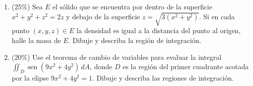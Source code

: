 \documentclass[11pt]{article}
\begin{document}
\begin{enumerate}
\begin{enumerate}
\item{} (17\%) Evalúe la integral $\displaystyle\int_0^1\int_0^{\cos^{-1}y} e^{\operatorname{sen}x}\,dx\,dy$. Dibuje y describa la región de integración.

\vspace{5cm}
\end{enumerate}

\item{} (25\%) Sea $E$ el sólido que se encuentra por dentro de la superficie $x^2+y^2+z^2=2z$ y debajo de la superficie $z=\sqrt{3(x^2+y^2)}$. Si en cada punto $(x,y,z)\in E$ la densidad es igual a la distancia del punto al origen, halle la masa de $E$. Dibuje y describa la región de integración.

\vspace{6cm}

\item{} (20\%) Use el teorema de cambio de variables para evaluar la integral $\displaystyle\iint_D \operatorname{sen}(9x^2+4y^2)\,dA$, donde $D$ es la región del primer cuadrante acotada por la elipse $9x^2+4y^2=1$. Dibuje y describa las regiones de integración.

\vspace{6cm}
\end{enumerate}

\examfooter
\end{document}
